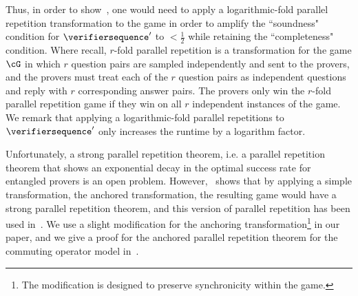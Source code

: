 Thus, in order to show~, one would need to apply a logarithmic-fold parallel repetition transformation to the game in order to amplify the ``soundness" condition for $\verifiersequence'$ to $< \frac{1}{2}$ while retaining the ``completeness" condition. Where recall, $r$-fold parallel repetition is a transformation for the game $\cG$ in which $r$ question pairs are sampled independently and sent to the provers, and the provers must treat each of the $r$ question pairs as independent questions and reply with $r$ corresponding answer pairs. The provers only win the $r$-fold parallel repetition game if they win on all $r$ independent instances of the game. We remark that applying a logarithmic-fold parallel repetitions to $\verifiersequence'$ only increases the runtime by a logarithm factor.

Unfortunately, a strong parallel repetition theorem, i.e. a parallel repetition theorem that shows an exponential decay in the optimal success rate for entangled provers is an open problem. However,~\cite{bavarianAnchoredParallelRepetition2021} shows that by applying a simple transformation, the anchored transformation, the resulting game would have a strong parallel repetition theorem, and this version of parallel repetition has been used in~\cite{jiMIPRE2022a}. We use a slight modification for the anchoring transformation\footnote{The modification is designed to preserve synchronicity within the game.} in our paper, and we give a proof for the anchored parallel repetition theorem for the commuting operator model in~. 

